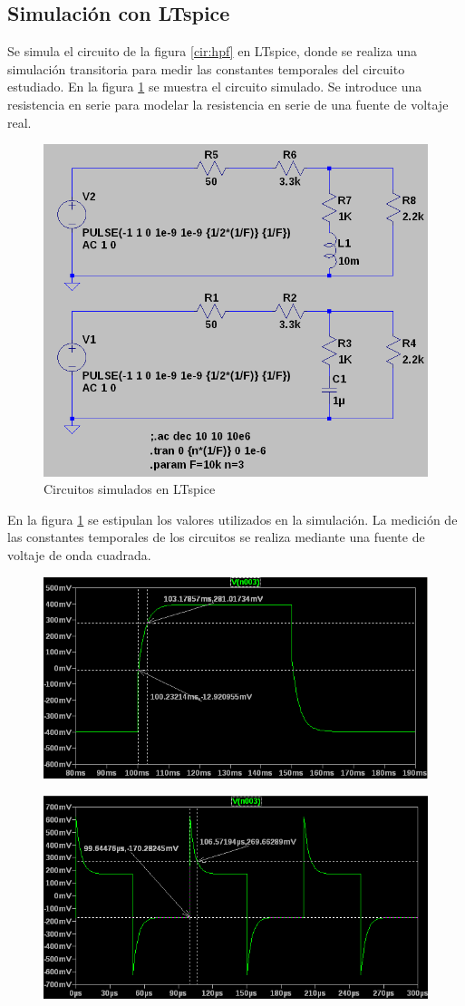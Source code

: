 \documentclass[letterpaper,11pt]{article}
\begin{document}
	\subsection{Simulación con LTspice}
		Se simula el circuito de la figura \ref{cir:hpf} en LTspice, donde se realiza una simulación transitoria para medir las constantes temporales del circuito estudiado. En la figura \ref{fig:circuitos_sim} se muestra el circuito simulado. Se introduce una resistencia en serie para modelar la resistencia en serie de una fuente de voltaje real.
		\begin{figure}[h!]
			\centering
			\includegraphics[width=0.7\linewidth]{sim_circuits}
			\caption{Circuitos simulados en LTspice}
			\label{fig:circuitos_sim}
		\end{figure}
		En la figura \ref{fig:circuitos_sim} se estipulan los valores utilizados en la simulación. La medición de las constantes temporales de los circuitos se realiza mediante una fuente de voltaje de onda cuadrada.
		\begin{figure}[h!]
			\centering
			\includegraphics[width=0.7\linewidth]{tau_rc_sim}
			\caption{}
			\label{fig:tau_rc_sim}
		\end{figure}
		\begin{figure}[h!]
			\centering
			\includegraphics[width=0.7\linewidth]{tau_rl_sim}
			\caption{}
			\label{fig:tau_rl_sim}
		\end{figure}
\end{document}
